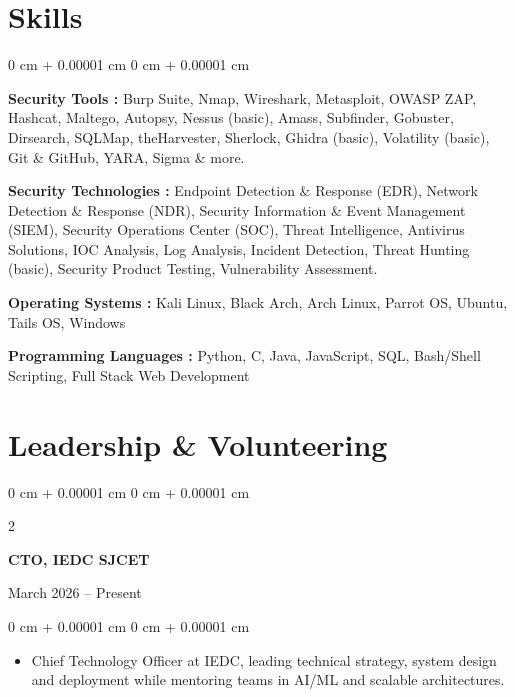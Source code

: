 \documentclass[10pt, a4paper]{article}
\newenvironment{highlights}{
    \begin{itemize}[
        topsep=0.10 cm,
        parsep=0.10 cm,
        partopsep=0pt,
        itemsep=0pt,
        leftmargin=0 cm + 10pt
    ]
}{
    \end{itemize}
} %
\newenvironment{onecolentry}{
    \begin{adjustwidth}{
        0 cm + 0.00001 cm
    }{
        0 cm + 0.00001 cm
    }
}{
    \end{adjustwidth}
} %
\newenvironment{twocolentry}[2][]{
    \onecolentry
    \def\secondColumn{#2}
    \setcolumnwidth{\fill, 4.5 cm}
    \begin{paracol}{2}
}{
    \switchcolumn \raggedleft \secondColumn
    \end{paracol}
    \endonecolentry
} %
\begin{document}
    \section{Skills}

    \begin{onecolentry}
        
        \textbf{Security Tools :} Burp Suite, Nmap, Wireshark, Metasploit, OWASP ZAP, Hashcat, Maltego, Autopsy, Nessus (basic), Amass, Subfinder, Gobuster, Dirsearch, SQLMap, theHarvester, Sherlock, Ghidra (basic), Volatility (basic), Git \& GitHub, YARA, Sigma \& more.

        \vspace{0.1 cm}

        \textbf{Security Technologies :} Endpoint Detection \& Response (EDR), Network Detection \& Response (NDR), Security Information \& Event Management (SIEM), Security Operations Center (SOC), Threat Intelligence, Antivirus Solutions, IOC Analysis, Log Analysis, Incident Detection, Threat Hunting (basic), Security Product Testing, Vulnerability Assessment.

        \vspace{0.1 cm}

        \textbf{Operating Systems :} Kali Linux, Black Arch, Arch Linux, Parrot OS, Ubuntu, Tails OS, Windows

        \vspace{0.1 cm}

        \textbf{Programming Languages :}  Python, C, Java, JavaScript, SQL, Bash/Shell Scripting, Full Stack Web Development
        
    \end{onecolentry}

    \section{Leadership \& Volunteering}
    
    \vspace{0.2 cm}

\begin{twocolentry}{
    March 2026 – Present
}
    \textbf{CTO, IEDC SJCET}
\end{twocolentry}

\vspace{0.10 cm}
\begin{onecolentry}
    \begin{highlights}
        \item Chief Technology Officer at IEDC, leading technical strategy, system design and deployment while mentoring teams in AI/ML and scalable architectures.
    \end{highlights}
\end{onecolentry}
\end{document}

